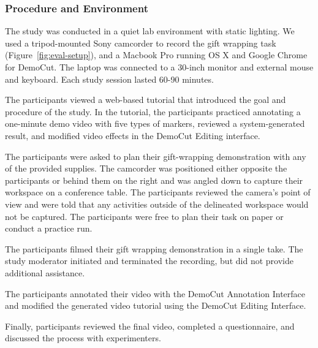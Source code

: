 \subsubsection{Procedure and Environment}
The study was conducted in a quiet lab environment with static lighting. We used a tripod-mounted Sony camcorder to record the gift wrapping task (Figure~\ref{fig:eval-setup}), and a Macbook Pro running OS X and Google Chrome for DemoCut. The laptop was connected to a 30-inch monitor and external mouse and keyboard. Each study session lasted 60-90 minutes.

 The participants viewed a web-based tutorial that introduced the goal and procedure of the study. In the tutorial, the participants practiced annotating a one-minute demo video with five types of markers, reviewed a system-generated result, and modified video effects in the DemoCut Editing interface.

 The participants were asked to plan their gift-wrapping demonstration with any of the provided supplies. The camcorder was positioned either opposite the participants or behind them on the right and was angled down to capture their workspace on a conference table. The participants reviewed the camera's point of view and were told that any activities outside of the delineated workspace would not be captured. The participants were free to plan their task on paper or conduct a practice run. %

 The participants filmed their gift wrapping demonstration in a single take. The study moderator initiated and terminated the recording, but did not provide additional assistance.

 The participants annotated their video with the DemoCut Annotation Interface and modified the generated video tutorial using the DemoCut Editing Interface.

 Finally, participants reviewed the final video, completed a questionnaire, and discussed the process with experimenters.
